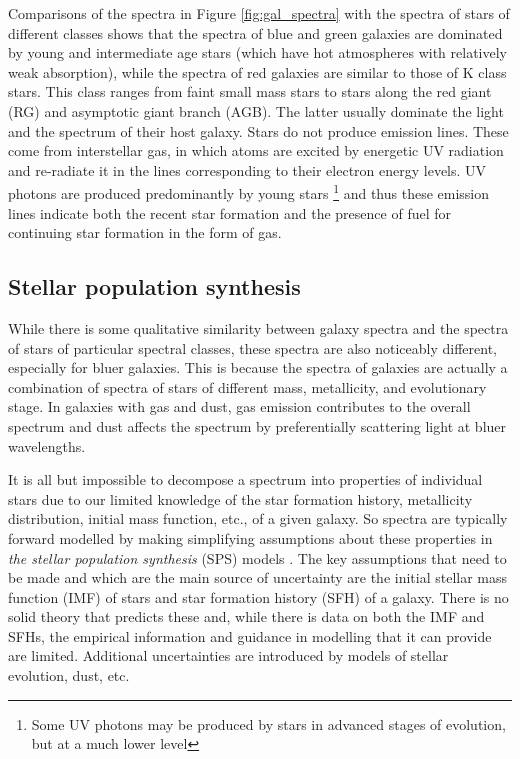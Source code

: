 Comparisons of the spectra in Figure \ref{fig:gal_spectra}  with the spectra of stars of different classes \citep[see, e.g., spectra in][]{jacoby_etal84} shows that the spectra of blue and green galaxies are dominated by young and intermediate age stars (which have hot atmospheres with relatively weak absorption), while the spectra of red galaxies are similar to those of K class stars. This class ranges from faint small mass stars to stars along the red giant (RG) and asymptotic giant branch (AGB). The latter usually dominate the light and the spectrum of their host galaxy. Stars do not produce emission lines. These come from interstellar gas, in which atoms are excited by energetic UV radiation and re-radiate it in the lines corresponding to their electron energy levels. UV photons are produced predominantly by young stars \footnote{Some UV photons may be produced by stars in advanced stages of evolution, but at a much lower level} and thus these emission lines indicate both the recent star formation and the presence of fuel for continuing star formation in the form of gas. 

\subsection{Stellar population synthesis}
\label{sec:SPSoverview}

While there is some qualitative similarity between galaxy spectra and the spectra of stars of particular spectral classes, these spectra are also noticeably different, especially 
for bluer galaxies. This is because the spectra of galaxies are actually a combination of spectra of stars of different mass, metallicity, and evolutionary stage. In galaxies with gas and dust, gas emission contributes to the overall spectrum and dust affects the spectrum by preferentially scattering light at bluer wavelengths.  

It is all but impossible
to decompose a spectrum into properties of individual stars due to our limited knowledge of the star formation history, metallicity distribution, initial mass function, etc., of a given galaxy. So 
spectra are typically forward modelled by making simplifying assumptions about these properties in {\it the stellar population synthesis} (SPS) models \citep[see][for a recent in depth review]{conroy13}. The key assumptions that need to be made and which are the main source of uncertainty are the initial stellar mass function (IMF) of stars and star formation history (SFH) of a galaxy. There is no solid theory that predicts these and, while there is data on both the IMF and SFHs, the empirical information and guidance in modelling that it can provide are limited. Additional uncertainties are introduced by models of stellar evolution, dust, etc.

